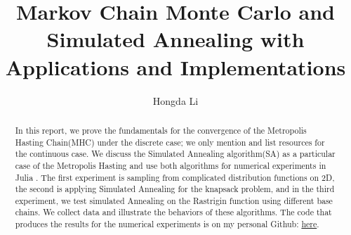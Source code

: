 \documentclass[]{article}
\title{Markov Chain Monte Carlo and Simulated Annealing with Applications and Implementations}
\author{Hongda Li}
\theoremstyle{definition}
\begin{document}
\maketitle
\begin{abstract}
    In this report, we prove the fundamentals for the convergence of the Metropolis Hasting Chain(MHC) under the discrete case; we only mention and list resources for the continuous case. We discuss the Simulated Annealing algorithm(SA) as a particular case of the Metropolis Hasting and use both algorithms for numerical experiments in Julia \cite{article:julia}. The first experiment is sampling from complicated distribution functions on 2D, the second is applying Simulated Annealing for the knapsack problem, and in the third experiment, we test simulated Annealing on the Rastrigin function using different base chains. We collect data and illustrate the behaviors of these algorithms. The code that produces the results for the numerical experiments is on my personal Github: \href{https://github.com/iluvjava/Metropolis-Hasting}{here}. 
\end{abstract}

\end{document}
